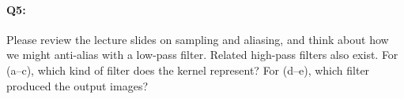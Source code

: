 



\pagebreak
\paragraph{Q5:} Please review the lecture slides on sampling and aliasing, and think about how we might anti-alias with a low-pass filter. Related high-pass filters also exist. For (a--c), which kind of filter does the kernel represent? For (d--e), which filter produced the output images?



